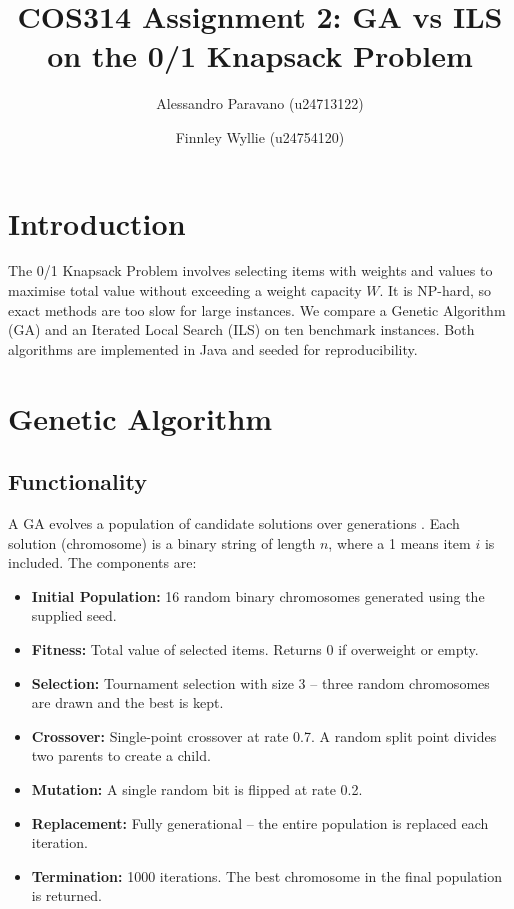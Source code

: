 \documentclass[12pt, a4paper]{article}
\title{COS314 Assignment 2: GA vs ILS on the 0/1 Knapsack Problem}
\author{Alessandro Paravano (u24713122) \and Finnley Wyllie (u24754120)}
\begin{document}
\maketitle

\section{Introduction}

The 0/1 Knapsack Problem involves selecting items with weights and values to maximise total value without exceeding a weight capacity $W$. It is NP-hard, so exact methods are too slow for large instances. We compare a Genetic Algorithm (GA) and an Iterated Local Search (ILS) on ten benchmark instances. Both algorithms are implemented in Java and seeded for reproducibility.

\section{Genetic Algorithm}

\subsection{Functionality}

A GA evolves a population of candidate solutions over generations \cite{notes}. Each solution (chromosome) is a binary string of length $n$, where a 1 means item $i$ is included. The components are:

\begin{itemize}
    \item \textbf{Initial Population:} 16 random binary chromosomes generated using the supplied seed.
    \item \textbf{Fitness:} Total value of selected items. Returns 0 if overweight or empty.
    \item \textbf{Selection:} Tournament selection with size 3 -- three random chromosomes are drawn and the best is kept.
    \item \textbf{Crossover:} Single-point crossover at rate 0.7. A random split point divides two parents to create a child.
    \item \textbf{Mutation:} A single random bit is flipped at rate 0.2.
    \item \textbf{Replacement:} Fully generational -- the entire population is replaced each iteration.
    \item \textbf{Termination:} 1000 iterations. The best chromosome in the final population is returned.
\end{itemize}
\end{document}
